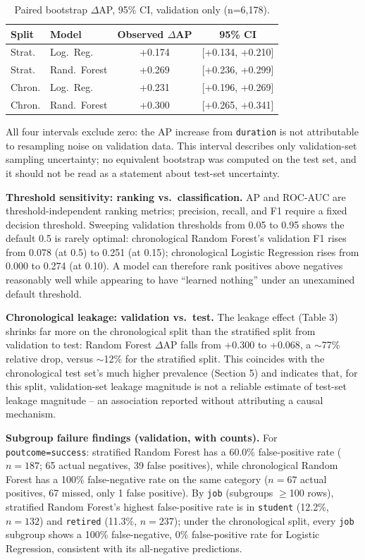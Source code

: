 \documentclass{article}
\begin{document}
\begin{table}[ht]
\centering
\footnotesize
\caption{Paired bootstrap $\Delta$AP, 95\% CI, validation only (n=6{,}178).}
\begin{tabular}{llcc}
\toprule
Split & Model & Observed $\Delta$AP & 95\% CI \\
\midrule
Strat. & Log.\ Reg. & +0.174 & [+0.134, +0.210] \\
Strat. & Rand.\ Forest & +0.269 & [+0.236, +0.299] \\
Chron. & Log.\ Reg. & +0.231 & [+0.196, +0.269] \\
Chron. & Rand.\ Forest & +0.300 & [+0.265, +0.341] \\
\bottomrule
\end{tabular}
\end{table}

All four intervals exclude zero: the AP increase from \texttt{duration} is
not attributable to resampling noise on validation data. This interval
describes only validation-set sampling uncertainty; no equivalent bootstrap
was computed on the test set, and it should not be read as a statement
about test-set uncertainty.

\textbf{Threshold sensitivity: ranking vs.\ classification.} AP and ROC-AUC
are threshold-independent ranking metrics; precision, recall, and F1 require
a fixed decision threshold. Sweeping validation thresholds from 0.05 to 0.95
shows the default 0.5 is rarely optimal: chronological Random Forest's
validation F1 rises from 0.078 (at 0.5) to 0.251 (at 0.15); chronological
Logistic Regression rises from 0.000 to 0.274 (at 0.10). A model can
therefore rank positives above negatives reasonably well while appearing to
have ``learned nothing'' under an unexamined default threshold.

\textbf{Chronological leakage: validation vs.\ test.} The leakage effect
(Table 3) shrinks far more on the chronological split than the stratified
split from validation to test: Random Forest $\Delta$AP falls from +0.300 to
+0.068, a $\sim$77\% relative drop, versus $\sim$12\% for the stratified
split. This coincides with the chronological test set's much higher
prevalence (Section 5) and indicates that, for this split, validation-set
leakage magnitude is not a reliable estimate of test-set leakage magnitude
-- an association reported without attributing a causal mechanism.

\textbf{Subgroup failure findings (validation, with counts).} For
\texttt{poutcome=success}: stratified Random Forest has a 60.0\%
false-positive rate ($n{=}187$; 65 actual negatives, 39 false positives),
while chronological Random Forest has a 100\% false-negative rate on the
same category ($n{=}67$ actual positives, 67 missed, only 1 false positive).
By \texttt{job} (subgroups $\ge$100 rows), stratified Random Forest's
highest false-positive rate is in \texttt{student} (12.2\%, $n{=}132$) and
\texttt{retired} (11.3\%, $n{=}237$); under the chronological split, every
\texttt{job} subgroup shows a 100\% false-negative, 0\% false-positive rate
for Logistic Regression, consistent with its all-negative predictions.
\end{document}

